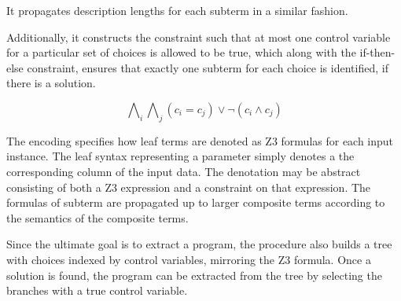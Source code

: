\documentclass[letterpaper]{llncs}
\begin{document}
It propagates description lengths for each subterm in a similar fashion.

Additionally, it constructs the constraint such that at most one control variable for a particular set of choices    
is allowed to be true, which along with the if-then-else constraint, ensures
that exactly one subterm for each choice is identified, if there is a solution.  

\[
  \bigwedge\nolimits_i \bigwedge\nolimits_j (c_i = c_j) \vee \neg (c_i \wedge c_j) 
\]


The encoding specifies how leaf terms are denoted as Z3 formulas for each input instance.
The leaf syntax representing a parameter simply denotes a the corresponding column of the input data. 
The denotation may be abstract consisting of both a Z3 expression and a constraint on that expression. 
The formulas of subterm are propagated up to larger composite terms according to the semantics of 
the composite terms.

Since the ultimate goal is to extract a program, the procedure also 
builds a tree with choices indexed by control variables, mirroring the Z3 formula.
Once a solution is found, the program can be extracted from the tree by selecting
the branches with a true control variable.
\end{document}
